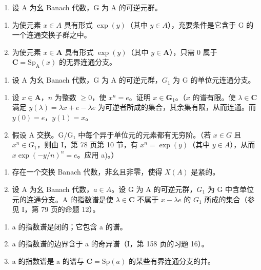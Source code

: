 \begin{enumerate}
\def\labelenumi{\arabic{enumi})}
\setcounter{enumi}{1}
\tightlist
\item
  设 A 为幺 Banach 代数，G 为 A 的可逆元群。
\end{enumerate}

\begin{enumerate}
\def\labelenumi{\alph{enumi})}
\item
  为使元素 \(x \in A\) 具有形式 \(\exp(y)\)（其中 \(y \in A\)），充要条件是它含于 G 的一个连通交换子群之中。
\item
  为使元素 \(x \in \mathbf{A}\) 具有形式 \(\exp(y)\)（其中 \(y \in \mathbf{A}\)），只需 0 属于 \(\mathbf{C} = \mathrm{Sp}_{\mathrm{A}}(x)\) 的无界连通分支。
\end{enumerate}

\begin{enumerate}
\def\labelenumi{\arabic{enumi})}
\setcounter{enumi}{2}
\tightlist
\item
  设 A 为幺 Banach 代数，G 为 A 的可逆元群，\(G_{1}\) 为 G 的单位元连通分支。
\end{enumerate}

\begin{enumerate}
\def\labelenumi{\alph{enumi})}
\item
  设 \(x \in \mathbf{A}\)，\(n\) 为整数 \(\geqslant 0\)，使 \(x^n = e\)。证明 \(x \in \mathbf{G}_1\)。（\(x\) 的谱有限。使 \(\lambda \in \mathbf{C}\) 满足 \(y(\lambda) = \lambda x + e - \lambda e\) 为可逆者所成的集合，其余集有限，从而连通。而 \(y(0) = e\)，\(y(1) = x\)。
\item
  假设 A 交换。G/G₁ 中每个异于单位元的元素都有无穷阶。（若 \(x \in G\) 且 \(x^n \in G_1\)，则由 I，第 78 页第 10 节，有 \(x^n = \exp(y)\)（其中 \(y \in A\)），从而 \(x \exp(-y/n)^n = e\)。应用 a)。）
\end{enumerate}

\begin{enumerate}
\def\labelenumi{\arabic{enumi})}
\setcounter{enumi}{3}
\item
  存在一个交换 Banach 代数，非幺且非零，使得 \(X(A)\) 是紧的。
\item
  设 A 为幺 Banach 代数，\(a \in A\)。设 G 为 A 的可逆元群，\(G_1\) 为 G 中含单位元的连通分支。A 的指数谱是使 \(\lambda \in \mathbf{C}\) 不属于 \(x - \lambda e\) 的 \(G_1\) 所成的集合（参见 I，第 79 页的命题 12）。
\end{enumerate}

\begin{enumerate}
\def\labelenumi{\alph{enumi})}
\item
  a 的指数谱是闭的；它包含 a 的谱。
\item
  a 的指数谱的边界含于 a 的奇异谱（I，第 158 页的习题 16）。
\item
  a 的指数谱是 a 的谱与 \(\mathbf{C}=\mathrm{Sp}(a)\) 的某些有界连通分支的并。
\end{enumerate}

